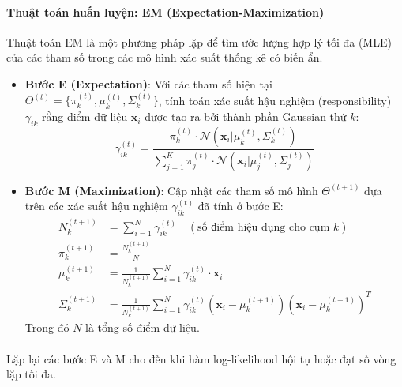 \paragraph{Thuật toán huấn luyện: EM (Expectation-Maximization)} {}
Thuật toán EM là một phương pháp lặp để tìm ước lượng hợp lý tối đa (MLE) của các tham số trong các mô hình xác suất thống kê có biến ẩn.
\begin{itemize}
  \item \textbf{Bước E (Expectation)}: Với các tham số hiện tại $\Theta^{(t)} = \{\pi_k^{(t)}, \mu_k^{(t)}, \Sigma_k^{(t)}\}$, tính toán xác suất hậu nghiệm (responsibility) $\gamma_{ik}$ rằng điểm dữ liệu $\mathbf{x}_i$ được tạo ra bởi thành phần Gaussian thứ $k$:
  \begin{equation}
    \gamma_{ik}^{(t)} = \frac{\pi_k^{(t)} \cdot \mathcal{N}(\mathbf{x}_i | \mu_k^{(t)}, \Sigma_k^{(t)})}{\sum_{j=1}^K \pi_j^{(t)} \cdot \mathcal{N}(\mathbf{x}_i | \mu_j^{(t)}, \Sigma_j^{(t)})}
  \end{equation}

  \item \textbf{Bước M (Maximization)}: Cập nhật các tham số mô hình $\Theta^{(t+1)}$ dựa trên các xác suất hậu nghiệm $\gamma_{ik}^{(t)}$ đã tính ở bước E:
  \begin{align}
    N_k^{(t+1)} &= \sum_{i=1}^{N} \gamma_{ik}^{(t)} \quad (\text{số điểm hiệu dụng cho cụm } k) \\
    \pi_k^{(t+1)} &= \frac{N_k^{(t+1)}}{N} \\
    \mu_k^{(t+1)} &= \frac{1}{N_k^{(t+1)}} \sum_{i=1}^{N} \gamma_{ik}^{(t)} \cdot \mathbf{x}_i \\
    \Sigma_k^{(t+1)} &= \frac{1}{N_k^{(t+1)}} \sum_{i=1}^{N} \gamma_{ik}^{(t)} (\mathbf{x}_i - \mu_k^{(t+1)})(\mathbf{x}_i - \mu_k^{(t+1)})^T
  \end{align}
  Trong đó $N$ là tổng số điểm dữ liệu.
\end{itemize}

\paragraph{}{Lặp lại các bước E và M cho đến khi hàm log-likelihood hội tụ hoặc đạt số vòng lặp tối đa.}

\pagebreak